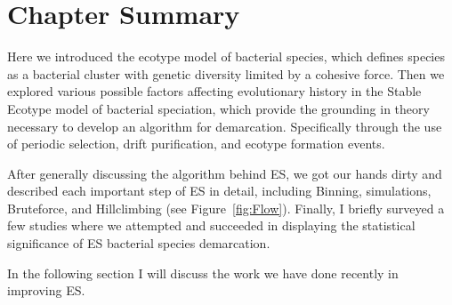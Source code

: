 \section{Chapter Summary}
Here we introduced the ecotype model of bacterial species, which defines species as a bacterial cluster with genetic diversity limited by a cohesive force.
Then we explored various possible factors affecting evolutionary history in the Stable Ecotype model of bacterial speciation, which provide the grounding in theory necessary to develop an algorithm for demarcation.
Specifically through the use of periodic selection, drift purification, and ecotype formation events.

After generally discussing the algorithm behind ES, we got our hands dirty and described each important step of ES in detail, including Binning, simulations, Bruteforce, and Hillclimbing (see Figure~\ref{fig:Flow}).
Finally, I briefly surveyed a few studies where we attempted and succeeded in displaying the statistical significance of ES bacterial species demarcation.

In the following section I will discuss the work we have done recently in improving ES.




